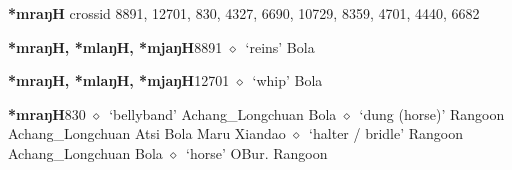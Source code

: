 \item
\textbf{*mraŋH}
  {\tiny crossid 8891, 12701, 830, 4327, 6690, 10729, 8359, 4701, 4440, 6682}
  \begin{list}{}{\leftmargin=1.5em \itemindent=-1.5em}
  \item {\footnotesize \textbf{*mraŋH, *mlaŋH, *mjaŋH}}{\tiny 8891}
         $\diamond$~`reins'
         Bola 
  \item {\footnotesize \textbf{*mraŋH, *mlaŋH, *mjaŋH}}{\tiny 12701}
\hspace{1ex}
         $\diamond$~`whip'
         Bola 
  \item {\footnotesize \textbf{*mraŋH}}{\tiny 830}
\hspace{1ex}
         $\diamond$~`bellyband'
         Achang\_Longchuan 
\hspace{1ex}
         Bola 
\hspace{1ex}
         $\diamond$~`dung (horse)'
         Rangoon 
\hspace{1ex}
         Achang\_Longchuan 
\hspace{1ex}
         Atsi 
\hspace{1ex}
         Bola 
\hspace{1ex}
         Maru 
\hspace{1ex}
         Xiandao 
\hspace{1ex}
         $\diamond$~`halter / bridle'
         Rangoon 
\hspace{1ex}
         Achang\_Longchuan 
\hspace{1ex}
         Bola 
\hspace{1ex}
         $\diamond$~`horse'
         OBur. 
\hspace{1ex}
         Rangoon 
\hspace{1ex}

\end{list}

